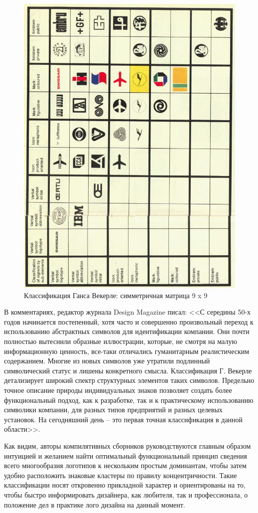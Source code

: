 \begin{figure}
  \centering
  \includegraphics[width=.5\linewidth]{images/wekerle}
  \caption{Классификация Ганса Векерле: симметричная матрица 9 x 9}
  \label{fig:wekerle}
\end{figure}

В комментариях, редактор журнала Design Magazine писал: <<С середины 50-х годов начинается постепенный, хотя часто и совершенно произвольный переход к использованию абстрактных символов для идентификации компании. Они почти полностью вытеснили образные иллюстрации, которые, не смотря на малую информационную ценность, все-таки отличались гуманитарным реалистическим содержанием. Многие из новых символов уже утратили подлинный символический статус и лишены конкретного смысла.  Классификация Г. Векерле детализирует широкий спектр структурных элементов таких символов. Предельно точное описание природы индивидуальных знаков  позволяет создать более функциональный подход, как к  разработке, так и к практическому использованию символики компании, для разных типов предприятий и разных целевых установок.  На сегодняшний день – это первая точная классификация в данной области>>.

Как видим, авторы компилятивных сборников руководствуются главным образом интуицией и желанием найти
оптимальный функциональный принцип сведения всего многообразия логотипов к нескольким простым
доминантам, чтобы затем удобно расположить знаковые кластеры по правилу концентричности. Такие
классификации носят откровенно прикладной характер и ориентированы на то, чтобы быстро информировать
дизайнера, как любителя, так и профессионала, о положение дел в практике лого дизайна на данный
момент.

